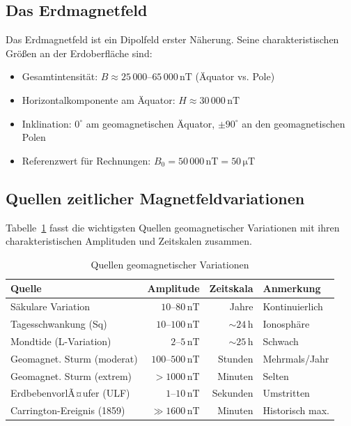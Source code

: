 ﻿\documentclass[a4paper,12pt]{article}
\theoremstyle{definition}
\begin{document}
\subsection{Das Erdmagnetfeld}

Das Erdmagnetfeld ist ein Dipolfeld erster N\"aherung. Seine charakteristischen
Gr\"o{\ss}en an der Erdoberfl\"ache sind:

\begin{itemize}
    \item Gesamtintensit\"at: $B \approx 25\,000$--$65\,000\,\mathrm{nT}$
          (\"Aquator vs. Pole)
    \item Horizontalkomponente am \"Aquator: $H \approx 30\,000\,\mathrm{nT}$
    \item Inklination: $0^{\circ}$ am geomagnetischen \"Aquator, $\pm 90^{\circ}$
          an den geomagnetischen Polen
    \item Referenzwert f\"ur Rechnungen: $B_0 = 50\,000\,\mathrm{nT} = 50\,\mathrm{\mu T}$
\end{itemize}

\subsection{Quellen zeitlicher Magnetfeldvariationen}

Tabelle~\ref{tab:quellen} fasst die wichtigsten Quellen geomagnetischer
Variationen mit ihren charakteristischen Amplituden und Zeitskalen zusammen.

\begin{table}[h!]
\centering
\caption{Quellen geomagnetischer Variationen}
\label{tab:quellen}
\begin{tabular}{lrrl}
\toprule
\textbf{Quelle} & \textbf{Amplitude} & \textbf{Zeitskala} & \textbf{Anmerkung} \\
\midrule
S\"akulare Variation      & $10$--$80\,\mathrm{nT}$   & Jahre          & Kontinuierlich \\
Tagesschwankung (Sq)      & $10$--$100\,\mathrm{nT}$  & $\sim 24\,\mathrm{h}$  & Ionosph\"are \\
Mondtide (L-Variation)    & $2$--$5\,\mathrm{nT}$     & $\sim 25\,\mathrm{h}$  & Schwach \\
Geomagnet. Sturm (moderat)& $100$--$500\,\mathrm{nT}$ & Stunden        & Mehrmals/Jahr \\
Geomagnet. Sturm (extrem) & $>1000\,\mathrm{nT}$      & Minuten        & Selten \\
ErdbebenvorlÃ¤ufer (ULF)   & $1$--$10\,\mathrm{nT}$    & Sekunden       & Umstritten \\
Carrington-Ereignis (1859)& $\gg 1600\,\mathrm{nT}$  & Minuten        & Historisch max. \\
\bottomrule
\end{tabular}
\end{table}
\end{document}
